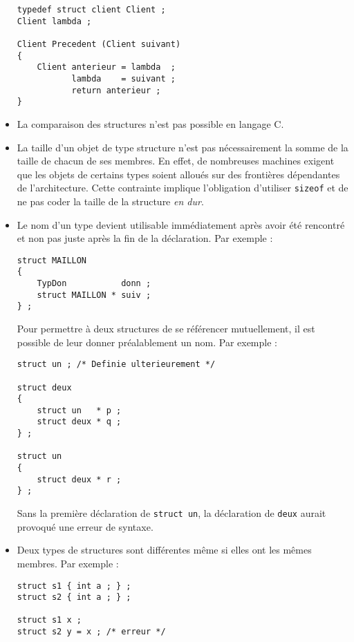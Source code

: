 \begin{multicols}{2}
\begin{itemize}
{\small
\begin{verbatim}  
typedef struct client Client ;
Client lambda ;

Client Precedent (Client suivant)
{
    Client anterieur = lambda  ;
		   lambda    = suivant ;
		   return anterieur ;
} 
\end{verbatim} }

\item La comparaison des structures n'est pas possible en langage C.

\item La taille d'un objet de type structure n'est pas n\'ecessairement la somme
de la taille de chacun de ses membres. En effet, de nombreuses machines
exigent que les objets de certains types soient allou\'es sur des fronti\`eres
d\'ependantes de l'architecture. Cette contrainte implique l'obligation
d'utiliser {\tt sizeof} et de ne pas coder la taille de la structure {\it en
dur}.

\item Le nom d'un type devient utilisable imm\'ediatement apr\`es avoir \'et\'e
rencontr\'e et non pas juste apr\`es la fin de la d\'eclaration. Par exemple :

{\small
\begin{verbatim}  
struct MAILLON
{
    TypDon           donn ;
    struct MAILLON * suiv ;
} ;
\end{verbatim} }

Pour permettre \`a deux structures de se r\'ef\'erencer mutuellement, il est
possible de leur donner pr\'ealablement un nom. Par exemple :

{\small
\begin{verbatim}  
struct un ; /* Definie ulterieurement */

struct deux
{
    struct un   * p ;
    struct deux * q ;
} ;

struct un 
{
    struct deux * r ;
} ;
\end{verbatim} }

Sans la premi\`ere d\'eclaration de {\tt struct un}, la d\'eclaration de {\tt deux}
aurait provoqu\'e une erreur de syntaxe.

\item Deux types de structures sont diff\'erentes m\^eme si elles
ont les m\^emes membres. Par exemple :

{\small
\begin{verbatim}  
struct s1 { int a ; } ;
struct s2 { int a ; } ;

struct s1 x ;
struct s2 y = x ; /* erreur */
\end{verbatim} }

%
%
\end{itemize}


\newpage
~
\end{multicols}
